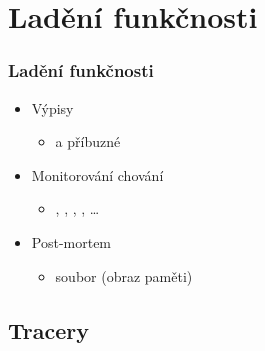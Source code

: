 \section{Ladění funkčnosti}
\frame{\sectionpage}

\begin{frame}
  \frametitle{Ladění funkčnosti}

  \begin{itemize}
    \item Výpisy
    \begin{itemize}
      \item {} a příbuzné
    \end{itemize}

    \pause

    \item Monitorování chování
    \begin{itemize}
      \item {}, , , , \dots
    \end{itemize}

    \pause

    \item Post-mortem
    \begin{itemize}
      \item {} soubor (obraz paměti)
    \end{itemize}
  \end{itemize}

\end{frame}

\subsection{Tracery}



\subsection{}



\subsection{}


